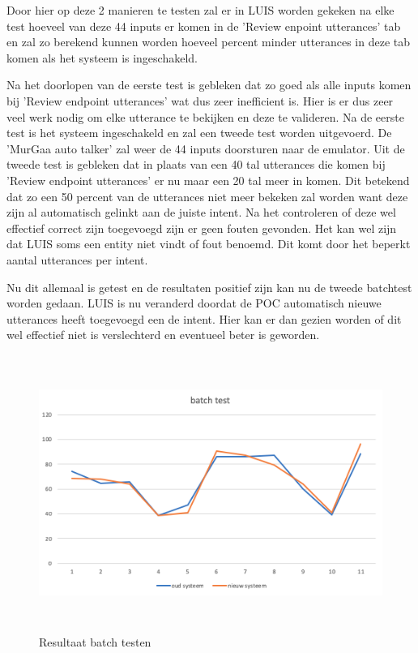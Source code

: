 Door hier op deze 2 manieren te testen zal er in LUIS worden gekeken na elke test hoeveel van deze 44 inputs er komen in de 'Review enpoint utterances' tab en zal zo berekend kunnen worden hoeveel percent minder utterances in deze tab komen als het systeem is ingeschakeld.

Na het doorlopen van de eerste test is gebleken dat zo goed als alle inputs komen bij 'Review endpoint utterances' wat dus zeer inefficient is. Hier is er dus zeer veel werk nodig om elke utterance te bekijken en deze te valideren. Na de eerste test is het systeem ingeschakeld en zal een tweede test worden uitgevoerd. De 'MurGaa auto talker' zal weer de 44 inputs doorsturen naar de emulator. Uit de tweede test is gebleken dat in plaats van een 40 tal utterances die komen bij 'Review endpoint utterances' er nu maar een 20 tal meer in komen. Dit betekend dat zo een 50 percent van de utterances niet meer bekeken zal worden want deze zijn al automatisch gelinkt aan de juiste intent. Na het controleren of deze wel effectief correct zijn toegevoegd zijn er geen fouten gevonden. Het kan wel zijn dat LUIS soms een entity niet vindt of fout benoemd. Dit komt door het beperkt aantal utterances per intent.

Nu dit allemaal is getest en de resultaten positief zijn kan nu de tweede batchtest worden gedaan. LUIS is nu veranderd doordat de POC automatisch nieuwe utterances heeft toegevoegd een de intent. Hier kan er dan gezien worden of dit wel effectief niet is verslechterd en eventueel beter is geworden.

\begin{figure}[h!]
	\centering
	\includegraphics[height=9cm]{img/grafiek.png}
	\caption{Resultaat batch testen}
	\label{fig:batchtest}
\end{figure}






